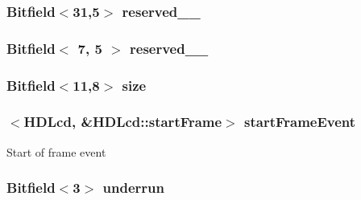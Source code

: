 \label{classHDLcd_a55b96b8eb8acba57e5ed38854674db7e}
\hypertarget{classHDLcd_a1ac4b70cb79ab9e24b9a264c8b8be6e4}{
\subsubsection[{reserved\_\-31\_\-5}]{\setlength{\rightskip}{0pt plus 5cm}Bitfield$<$31,5$>$ {\bf reserved\_\_}}}
\label{classHDLcd_a1ac4b70cb79ab9e24b9a264c8b8be6e4}
\hypertarget{classHDLcd_ada612a1f3eac7720c95c8b754b004b62}{
\subsubsection[{reserved\_\-7\_\-5}]{\setlength{\rightskip}{0pt plus 5cm}Bitfield$<$ 7, 5 $>$ {\bf reserved\_\_}}}
\label{classHDLcd_ada612a1f3eac7720c95c8b754b004b62}
\hypertarget{classHDLcd_a9165522b50dc058c1a097ae26260fc61}{
\subsubsection[{size}]{\setlength{\rightskip}{0pt plus 5cm}Bitfield$<$11,8$>$ {\bf size}}}
\label{classHDLcd_a9165522b50dc058c1a097ae26260fc61}
\hypertarget{classHDLcd_ac7738466b6b60afeb71551c4f830d4fa}{
\subsubsection[{startFrameEvent}]{$<${\bf HDLcd}, \&HDLcd::startFrame$>$ {\bf startFrameEvent}}}
\label{classHDLcd_ac7738466b6b60afeb71551c4f830d4fa}
Start of frame event \hypertarget{classHDLcd_a7db18d8a83ae23e4d06cf8d21379b664}{
\subsubsection[{underrun}]{\setlength{\rightskip}{0pt plus 5cm}Bitfield$<$3$>$ {\bf underrun}}}
